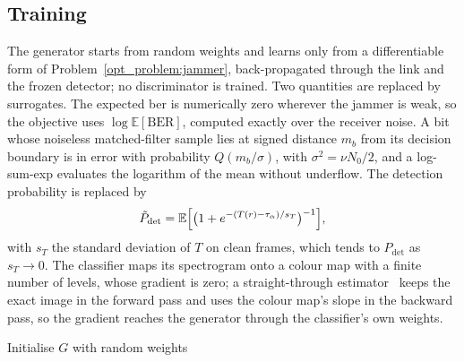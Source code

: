 \subsection{Training} \label{sec:method:training}
The generator starts from random weights and learns only from a differentiable form of Problem~\ref{opt_problem:jammer}, back-propagated through the link and the frozen detector; no discriminator is trained.
Two quantities are replaced by surrogates.
The expected \ac{ber} is numerically zero wherever the jammer is weak, so the objective uses $\log\mathbb{E}[\mathrm{BER}]$, computed exactly over the receiver noise.
A bit whose noiseless matched-filter sample lies at signed distance $m_b$ from its decision boundary is in error with probability $Q(m_b/\sigma)$, with $\sigma^2=\nu N_0/2$, and a log-sum-exp evaluates the logarithm of the mean without underflow.
The detection probability is replaced by
\begin{equation}
\tilde P_\text{det}=\mathbb{E}\Bigl[\bigl(1+e^{-(T(r)-\tau_\alpha)/s_T}\bigr)^{-1}\Bigr],
\label{eq:softpdet}
\end{equation}
with $s_T$ the standard deviation of $T$ on clean frames, which tends to $P_\text{det}$ as $s_T\to0$.
The classifier maps its spectrogram onto a colour map with a finite number of levels, whose gradient is zero; a straight-through estimator~\cite{bengio2013estimating} keeps the exact image in the forward pass and uses the colour map's slope in the backward pass, so the gradient reaches the generator through the classifier's own weights.

\begin{algorithm}[t]
    \DontPrintSemicolon
    Initialise $G$ with random weights\;
    \caption{Training of a generator against one detector\label{alg:train}}
\end{algorithm}

